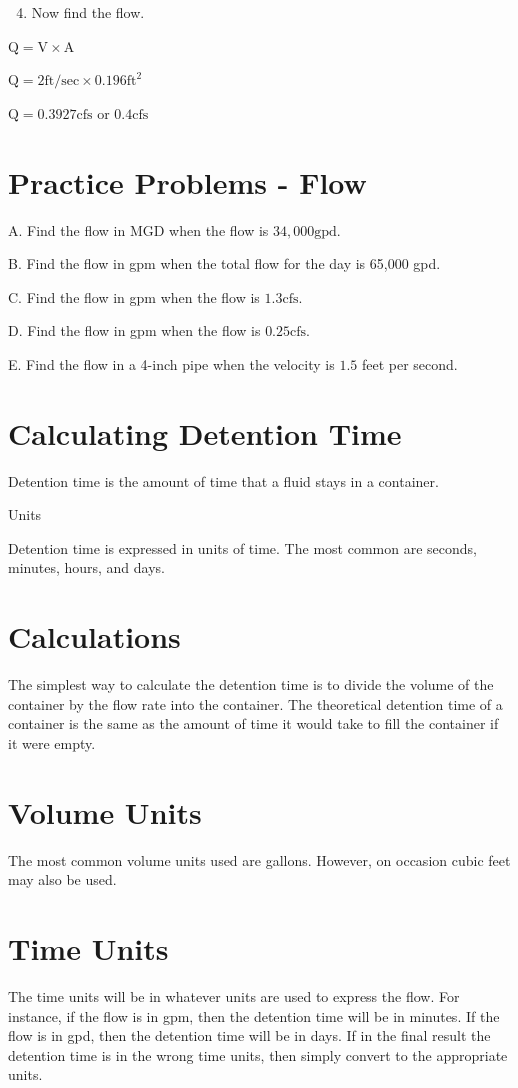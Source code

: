 \documentclass[10pt]{article}
\begin{document}
\begin{enumerate}
  \setcounter{enumi}{3}
  \item Now find the flow.
\end{enumerate}
$\mathrm{Q}=\mathrm{V} \times \mathrm{A}$

$\mathrm{Q}=2 \mathrm{ft} / \mathrm{sec} \times 0.196 \mathrm{ft}^{2}$

$\mathrm{Q}=0.3927 \mathrm{cfs}$ or $0.4 \mathrm{cfs}$

\section{Practice Problems - Flow}
A. Find the flow in MGD when the flow is $34,000 \mathrm{gpd}$.

B. Find the flow in gpm when the total flow for the day is 65,000 gpd.

C. Find the flow in gpm when the flow is $1.3 \mathrm{cfs}$.

D. Find the flow in gpm when the flow is $0.25 \mathrm{cfs}$.

E. Find the flow in a 4-inch pipe when the velocity is $1.5$ feet per second.

\section{Calculating Detention Time}
Detention time is the amount of time that a fluid stays in a container.

Units

Detention time is expressed in units of time. The most common are seconds, minutes, hours, and days.

\section{Calculations}
The simplest way to calculate the detention time is to divide the volume of the container by the flow rate into the container. The theoretical detention time of a container is the same as the amount of time it would take to fill the container if it were empty.

\section{Volume Units}
The most common volume units used are gallons. However, on occasion cubic feet may also be used.

\section{Time Units}
The time units will be in whatever units are used to express the flow. For instance, if the flow is in gpm, then the detention time will be in minutes. If the flow is in gpd, then the detention time will be in days. If in the final result the detention time is in the wrong time units, then simply convert to the appropriate units.
\end{document}
